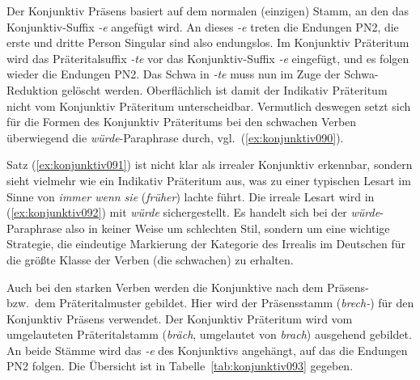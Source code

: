 
Der Konjunktiv Präsens basiert auf dem normalen (einzigen) Stamm, an den das Konjunktiv-Suffix \textit{-e} angefügt wird.
An dieses \textit{-e} treten die Endungen PN2, die erste und dritte Person Singular sind also endungslos.
Im Konjunktiv Präteritum wird das Präteritalsuffix \textit{-te} vor das Konjunktiv-Suffix \textit{-e} eingefügt, und es folgen wieder die Endungen PN2.
Das Schwa in \textit{-te} muss nun im Zuge der Schwa-Reduktion gelöscht werden.
Oberflächlich ist damit der Indikativ Präteritum nicht vom Konjunktiv Präteritum unterscheidbar.
Vermutlich deswegen setzt sich für die Formen des Konjunktiv Präteritums bei den schwachen Verben überwiegend die \textit{würde}-Paraphrase durch, vgl.\ (\ref{ex:konjunktiv090}).

\begin{exe}
  \ex\label{ex:konjunktiv090}
  \begin{xlist}
  \end{xlist}
\end{exe}

Satz (\ref{ex:konjunktiv091}) ist nicht klar als irrealer Konjunktiv erkennbar, sondern sieht vielmehr wie ein Indikativ Präteritum aus, was zu einer typischen Lesart im Sinne von \textit{immer wenn sie }(\textit{früher}) {lachte} führt.
Die irreale Lesart wird in (\ref{ex:konjunktiv092}) mit \textit{würde} sichergestellt.
Es handelt sich bei der \textit{würde}-Paraphrase also in keiner Weise um schlechten Stil, sondern um eine wichtige Strategie, die eindeutige Markierung der Kategorie des Irrealis im Deutschen für die größte Klasse der Verben (die schwachen) zu erhalten.

Auch bei den starken Verben werden die Konjunktive nach dem Präsens- bzw.\ dem Präteritalmuster gebildet.
Hier wird der Präsensstamm (\textit{brech-}) für den Konjunktiv Präsens verwendet.
Der Konjunktiv Präteritum wird vom umgelauteten Präteritalstamm (\textit{bräch}, umgelautet von \textit{brach}) ausgehend gebildet.
An beide Stämme wird das \textit{-e} des Konjunktivs angehängt, auf das die Endungen PN2 folgen.
Die Übersicht ist in Tabelle~\ref{tab:konjunktiv093} gegeben.

